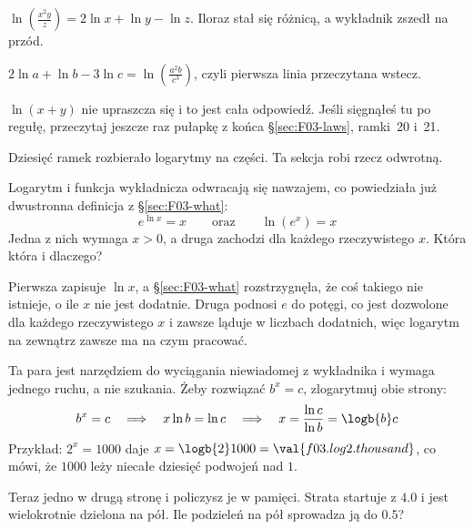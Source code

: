 \begin{fr}
\begin{ansblock}
$\ln\!\left(\frac{x^{2} y}{z}\right) = 2\ln x + \ln y - \ln z$. Iloraz stał się
różnicą, a wykładnik zszedł na przód.

$2\ln a + \ln b - 3\ln c = \ln\!\left(\frac{a^{2} b}{c^{3}}\right)$, czyli
pierwsza linia przeczytana wstecz.

$\ln(x + y)$ nie upraszcza się i to jest cała odpowiedź. Jeśli sięgnąłeś tu po
regułę, przeczytaj jeszcze raz pułapkę z końca \S\ref{sec:F03-laws}, ramki~20
i~21.
\end{ansblock}

Dziesięć ramek rozbierało logarytmy na części. Ta sekcja robi rzecz odwrotną.

Logarytm i funkcja wykładnicza odwracają się nawzajem, co powiedziała już
dwustronna definicja z \S\ref{sec:F03-what}:
\[ e^{\ln x} = x \qquad \text{oraz} \qquad \ln\!\left(e^{x}\right) = x \]
Jedna z nich wymaga $x > 0$, a druga zachodzi dla każdego rzeczywistego $x$.
Która która i dlaczego?
\nextframe
\end{fr}

\begin{fr}
Pierwsza zapisuje $\ln x$, a \S\ref{sec:F03-what} rozstrzygnęła, że coś takiego
nie istnieje, o ile $x$ nie jest dodatnie. Druga podnosi $e$ do potęgi, co jest
dozwolone dla każdego rzeczywistego $x$ i zawsze ląduje w liczbach dodatnich,
więc logarytm na zewnątrz zawsze ma na czym pracować.

Ta para jest narzędziem do wyciągania niewiadomej z wykładnika i wymaga jednego
ruchu, a nie szukania. Żeby rozwiązać $b^{x} = c$, zlogarytmuj obie strony:
\[ b^{x} = c \quad\Longrightarrow\quad x \ln b = \ln c
   \quad\Longrightarrow\quad x = \frac{\ln c}{\ln b} = \logb{b} c \]
Przykład: $2^{x} = 1000$ daje $x = \logb{2} 1000 = \val{f03.log2.thousand}$,
co mówi, że $1000$ leży niecałe dziesięć podwojeń nad $1$.

Teraz jedno w drugą stronę i policzysz je w pamięci. Strata startuje z
$\num{4.0}$ i jest wielokrotnie dzielona na pół. Ile podzieleń na pół sprowadza
ją do $\num{0.5}$?
\nextframe
\end{fr}

